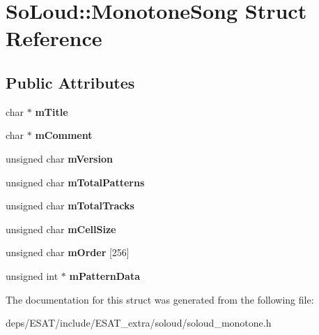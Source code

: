 \hypertarget{struct_so_loud_1_1_monotone_song}{}\section{So\+Loud\+:\+:Monotone\+Song Struct Reference}
\label{struct_so_loud_1_1_monotone_song}
\subsection*{Public Attributes}
\begin{DoxyCompactItemize}
\item 
\mbox{\label{struct_so_loud_1_1_monotone_song_ad4dbcdae4046658e37581cd5fde44686}} 
char $\ast$ {\bfseries m\+Title}
\item 
\mbox{\label{struct_so_loud_1_1_monotone_song_a1938dec3e97a6561e7ece26402db4e7f}} 
char $\ast$ {\bfseries m\+Comment}
\item 
\mbox{\label{struct_so_loud_1_1_monotone_song_a78d84ce7c2f2867d6779ff5a247c7ba1}} 
unsigned char {\bfseries m\+Version}
\item 
\mbox{\label{struct_so_loud_1_1_monotone_song_a4f17e14176d11f02d30b8fc3294bbe59}} 
unsigned char {\bfseries m\+Total\+Patterns}
\item 
\mbox{\label{struct_so_loud_1_1_monotone_song_a9acafb9b59449813cc4b2a5a52cfe077}} 
unsigned char {\bfseries m\+Total\+Tracks}
\item 
\mbox{\label{struct_so_loud_1_1_monotone_song_a6a12624368eab485c8f11f3a1afec9e1}} 
unsigned char {\bfseries m\+Cell\+Size}
\item 
\mbox{\label{struct_so_loud_1_1_monotone_song_a2aee4e18529f975d4643ab1a1e545351}} 
unsigned char {\bfseries m\+Order} \mbox{[}256\mbox{]}
\item 
\mbox{\label{struct_so_loud_1_1_monotone_song_af0268cbc0e458a3b2fae806c65d86649}} 
unsigned int $\ast$ {\bfseries m\+Pattern\+Data}
\end{DoxyCompactItemize}


The documentation for this struct was generated from the following file\+:\begin{DoxyCompactItemize}
\item 
deps/\+E\+S\+A\+T/include/\+E\+S\+A\+T\+\_\+extra/soloud/soloud\+\_\+monotone.\+h\end{DoxyCompactItemize}
